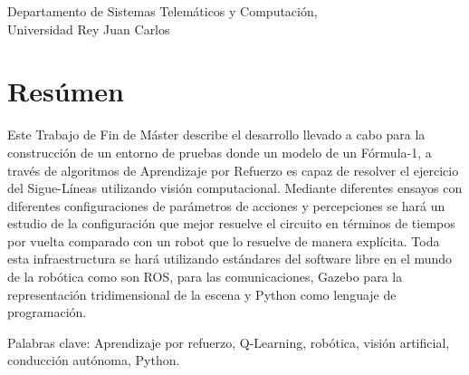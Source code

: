 
Departamento de Sistemas Telemáticos y Computación,\\
Universidad Rey Juan Carlos \setlength{\parskip}{0.5cm}

\thispagestyle{plain}			%
\setlength{\parskip}{0pt plus 1.0pt}
\section*{Resúmen}
Este Trabajo de Fin de Máster describe el desarrollo llevado a cabo para la construcción de un entorno de pruebas donde un modelo de un Fórmula-1, a través de algoritmos de Aprendizaje por Refuerzo es capaz de resolver el ejercicio del Sigue-Líneas utilizando visión computacional. Mediante diferentes ensayos con diferentes configuraciones de parámetros de acciones y percepciones se hará un estudio de la configuración que mejor resuelve el circuito en términos de tiempos por vuelta comparado con un robot que lo resuelve de manera explícita. Toda esta infraestructura se hará utilizando estándares del software libre en el mundo de la robótica como son ROS, para las comunicaciones, Gazebo para la representación tridimensional de la escena y Python como lenguaje de programación.


\vfill
Palabras clave: Aprendizaje por refuerzo, Q-Learning, robótica, visión artificial, conducción autónoma, Python.

\newpage				%
\thispagestyle{empty}
\mbox{}